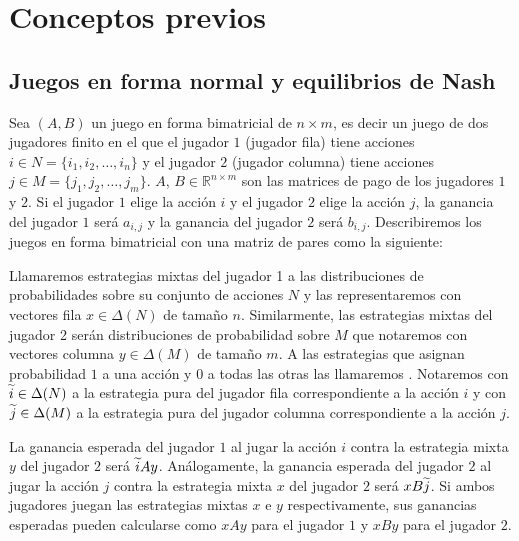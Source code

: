 \chapter{Conceptos previos}  \label{cap:previos}


\section{Juegos en forma normal y equilibrios de Nash}

Sea $(A, B)$ un juego en forma bimatricial de $n \times m$, es decir un juego de dos jugadores finito en el que el jugador $1$ (jugador fila) tiene acciones $i \in N = \{i_1, i_2, \dots, i_n\}$ y el jugador $2$ (jugador columna) tiene acciones $j \in M = \{j_1, j_2, \dots, j_m\}$. $A$, $B \in \mathbb{R}^{n \times m}$ son las matrices de pago de los jugadores $1$ y $2$. Si el jugador $1$ elige la acción $i$ y el jugador $2$ elige la acción $j$, la ganancia del jugador $1$ será $a_{i,j}$ y la ganancia del jugador $2$ será $b_{i,j}$. Describiremos los juegos en forma bimatricial con una matriz de pares como la siguiente:



Llamaremos estrategias mixtas del jugador 1 a las distribuciones de probabilidades sobre su conjunto de acciones $N$ y las representaremos con vectores fila $x \in \Delta(N)$ de tamaño $n$. Similarmente, las estrategias mixtas del jugador 2 serán distribuciones de probabilidad sobre $M$ que notaremos con vectores columna $y \in \Delta(M)$ de tamaño $m$. A las estrategias que asignan probabilidad $1$ a una acción y $0$ a todas las otras las llamaremos . Notaremos con $\widetilde{i}\in \Delta(N)$ a la estrategia pura del jugador fila correspondiente a la acción $i$ y con $\widetilde{j}\in \Delta(M)$ a la estrategia pura del jugador columna correspondiente a la acción $j$.

La ganancia esperada del jugador $1$ al jugar la acción $i$ contra la estrategia mixta $y$ del jugador $2$ será $\widetilde{i}Ay$. Análogamente, la ganancia esperada del jugador $2$ al jugar la acción $j$ contra la estrategia mixta $x$ del jugador $2$ será $xB\widetilde{j}$. Si ambos jugadores juegan las estrategias mixtas $x$ e $y$ respectivamente, sus ganancias esperadas pueden calcularse como $xAy$ para el jugador $1$ y $xBy$ para el jugador $2$.

